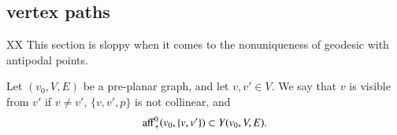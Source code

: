 


%




\subsection{vertex paths} %


XX This section is sloppy when it comes to the nonuniqueness of geodesic
with antipodal points.



\begin{definition}
Let $(v_0,V,E)$ be a pre-planar graph, and let $v,v'\in V$.  We say
that $v$ is visible from $v'$ if $v\ne v'$, $\{v,v',p\}$ is not
collinear,  and
  $${\operatorname{aff}}_+^0(v_0,\{v,v'\})\subset Y(v_0,V,E).$$
\end{definition}

